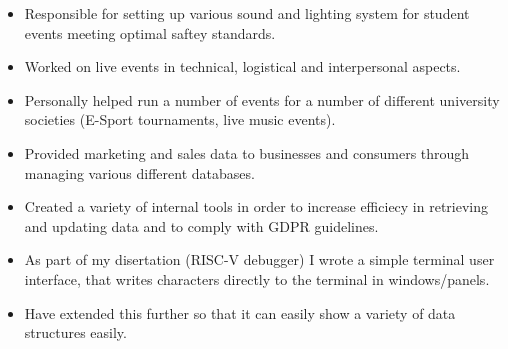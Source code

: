 \documentclass[10pt,a4paper,ragged2e,withhyper]{altacv}
\begin{document}
\divider

\begin{itemize}
	\item Responsible for setting up various sound and lighting system for student events meeting optimal saftey standards.
	\item Worked on live events in technical, logistical and interpersonal aspects.
	\item Personally helped run a number of events for a number of different university societies (E-Sport tournaments, live music events).
\end{itemize}

\divider

\begin{itemize}
	\item Provided marketing and sales data to businesses and consumers through managing various different databases.
	\item Created a variety of internal tools in order to increase efficiecy in retrieving and updating data and to comply with GDPR guidelines.
\end{itemize}



\begin{itemize}
	\item As part of my disertation (RISC-V debugger) I wrote a simple terminal user interface, that writes characters directly to the terminal in windows/panels.
	\item Have extended this further so that it can easily show a variety of data structures easily.
\end{itemize}


\divider


\end{document}
